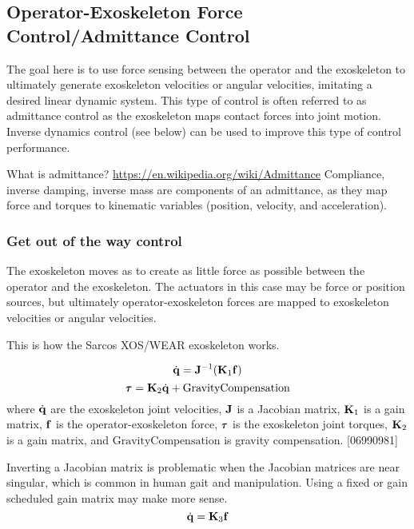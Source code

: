 \documentclass[letterpaper,12pt,fullpage]{article}
\newcommand{\gc}{{\mbox {GravityCompensation}}}
\begin{document}
\subsection{Operator-Exoskeleton Force Control/Admittance Control}

The goal here is to use force sensing between the operator and the
exoskeleton to ultimately generate exoskeleton velocities or angular velocities,
imitating a desired linear dynamic system.
This type of control is often referred to as admittance control as the
exoskeleton maps contact forces into joint motion.
Inverse dynamics control (see below)
can be used to improve this type of control performance.

What is admittance?
\url{https://en.wikipedia.org/wiki/Admittance}
Compliance, inverse damping, inverse mass are components of an admittance,
as they map force and torques to kinematic variables (position, velocity, and
acceleration). 

\subsubsection{Get out of the way control}

The exoskeleton moves as to create as little force as possible between the
operator and the exoskeleton. The actuators in this case may be force or
position sources, but ultimately operator-exoskeleton forces are mapped
to exoskeleton velocities or angular velocities.

This is how the Sarcos XOS/WEAR exoskeleton works.

\begin{equation}
\dot{{\bf q}} = {\bf J}^{-1} ({\bf K}_1 {\bf f})
\end{equation}
\begin{equation}
\vtau = \mK_2 \dot{\vq} + \gc
\end{equation}
where $\dot{{\bf q}}$ are the exoskeleton joint velocities,
${\bf J}$ is a Jacobian matrix, ${\bf K}_1$ is a gain matrix,
${\bf f}$ is the operator-exoskeleton force, 
$\vtau$ is the exoskeleton joint torques, ${\bf K}_2$ is a gain matrix,
and $\gc$ is gravity compensation.
[06990981]

Inverting a Jacobian matrix is problematic when the Jacobian matrices are
near singular, which is common in human gait and manipulation.
Using a fixed or gain scheduled gain matrix may make more sense.
\begin{equation}
\dot{{\bf q}} = {\bf K}_3 {\bf f}
\end{equation}
\end{document}

